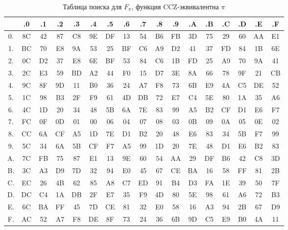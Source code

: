 \begin{table}
        \small
        \centering
        \begin{tabular}{c|cccccccccccccccc}
            & .0 & .1 & .2 & .3 & .4 & .5 & .6 & .7 & .8 & .9 & .A & .B & .C & .D & .E & .F  \\ \hline
            0. & 8C & 42 & 87 & C8 & 9E & DF & 13 & 54 & B6 & FB & 3D & 75 & 29 & 60 & AA & E1 \\
            1. & BC & 70 & E8 & 9A & 53 & 25 & BF & C6 & A9 & D2 & 41 & 37 & FD & 84 & 1B & 6E \\
            2. & 0C & D2 & 37 & E8 & 6E & BF & 53 & 84 & C6 & 1B & FD & 25 & A9 & 70 & 9A & 41 \\
            3. & 2C & E3 & 59 & BD & A2 & 44 & F0 & 15 & D7 & 3E & 8A & 66 & 78 & 9F & 21 & CB \\
            4. & 9C & 8F & 9D & 11 & B0 & 36 & 24 & A7 & F8 & 73 & 6B & E9 & 4A & C5 & DE & 52 \\
            5. & 1C & 98 & B3 & 2F & F9 & 61 & 4D & DB & 72 & E7 & C4 & 5E & 80 & 1A & 35 & A6 \\
            6. & 4C & 1D & 20 & 34 & 48 & 5B & 6A & 7E & 83 & 99 & A5 & B2 & CF & D1 & E6 & F7 \\
            7. & FC & 0F & 0D & 01 & 00 & 06 & 04 & 07 & 08 & 03 & 0B & 09 & 0A & 05 & 0E & 02 \\
            8. & CC & 6A & CF & A5 & 1D & 7E & D1 & B2 & 20 & 48 & E6 & 83 & 34 & 5B & F7 & 99 \\
            9. & 5C & 34 & 6A & 5B & CF & F7 & A5 & 99 & 1D & 20 & 7E & 48 & D1 & E6 & B2 & 83 \\
            A. & 7C & FB & 75 & 87 & E1 & 13 & 9E & 60 & 54 & AA & 29 & DF & B6 & 42 & C8 & 3D \\
            B. & 3C & A3 & D9 & 7D & 32 & 94 & E0 & 45 & 67 & CE & BA & 16 & 58 & FF & 81 & 2B \\
            C. & EC & 26 & 4B & 62 & 85 & A8 & C7 & ED & 91 & B4 & D3 & FA & 1E & 39 & 50 & 7F \\
            D. & DC & C4 & 1A & DB & 2F & E7 & 35 & F9 & 4D & 80 & 5E & 98 & 61 & A6 & 72 & B3 \\
            E. & 6C & BA & FF & 45 & 7D & CE & 81 & 32 & E0 & 58 & 16 & A3 & 94 & 2B & 67 & D9 \\
            F. & AC & 52 & A7 & F8 & DE & 8F & 73 & 24 & 36 & 6B & 9D & C5 & E9 & B0 & 4A & 11 \\
        \end{tabular}
        \caption{Таблица поиска для $F_{\pi}$, функция CCZ-эквивалентна \(\pi\)}
        \label{tab:A2}
\end{table}
    



